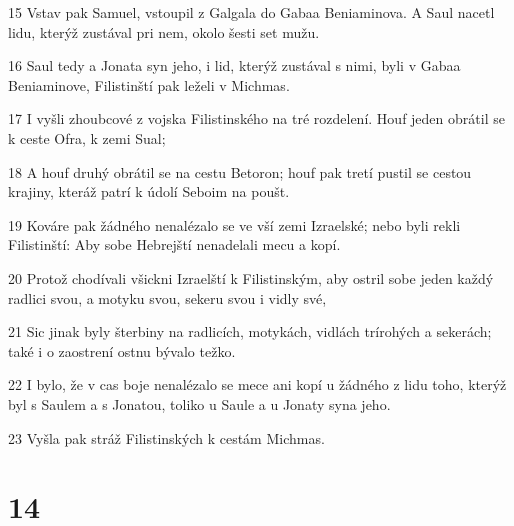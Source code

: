 \par 15 Vstav pak Samuel, vstoupil z Galgala do Gabaa Beniaminova. A Saul nacetl lidu, kterýž zustával pri nem, okolo šesti set mužu.
\par 16 Saul tedy a Jonata syn jeho, i lid, kterýž zustával s nimi, byli v Gabaa Beniaminove, Filistinští pak leželi v Michmas.
\par 17 I vyšli zhoubcové z vojska Filistinského na tré rozdelení. Houf jeden obrátil se k ceste Ofra, k zemi Sual;
\par 18 A houf druhý obrátil se na cestu Betoron; houf pak tretí pustil se cestou krajiny, kteráž patrí k údolí Seboim na poušt.
\par 19 Kováre pak žádného nenalézalo se ve vší zemi Izraelské; nebo byli rekli Filistinští: Aby sobe Hebrejští nenadelali mecu a kopí.
\par 20 Protož chodívali všickni Izraelští k Filistinským, aby ostril sobe jeden každý radlici svou, a motyku svou, sekeru svou i vidly své,
\par 21 Sic jinak byly šterbiny na radlicích, motykách, vidlách trírohých a sekerách; také i o zaostrení ostnu bývalo težko.
\par 22 I bylo, že v cas boje nenalézalo se mece ani kopí u žádného z lidu toho, kterýž byl s Saulem a s Jonatou, toliko u Saule a u Jonaty syna jeho.
\par 23 Vyšla pak stráž Filistinských k cestám Michmas.

\chapter{14}

